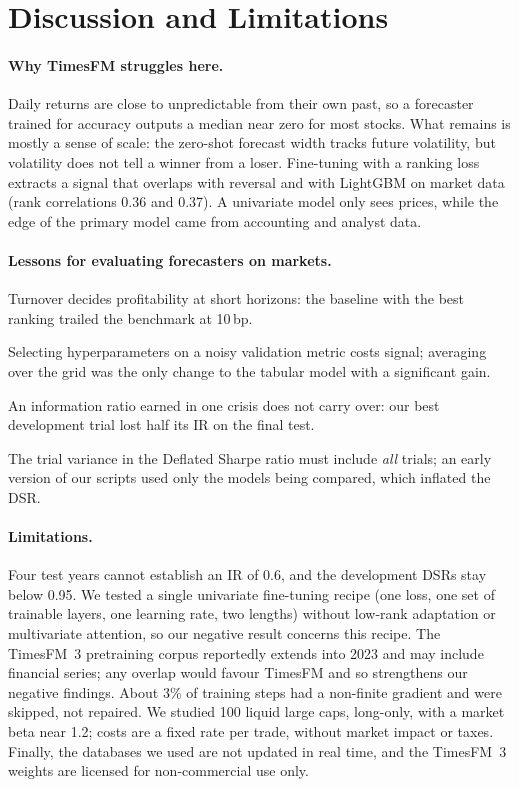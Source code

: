 \section{Discussion and Limitations}
\label{sec:discussion}

\paragraph{Why TimesFM struggles here.}
Daily returns are close to unpredictable from their own past, so a forecaster trained for accuracy outputs a median near zero for most stocks.
What remains is mostly a sense of scale: the zero-shot forecast width tracks future volatility, but volatility does not tell a winner from a loser.
Fine-tuning with a ranking loss extracts a signal that overlaps with reversal and with LightGBM on market data (rank correlations 0.36 and 0.37).
A univariate model only sees prices, while the edge of the primary model came from accounting and analyst data.

\paragraph{Lessons for evaluating forecasters on markets.}
\begin{enumerate*}[label=(\roman*)]
\item Turnover decides profitability at short horizons: the baseline with the best ranking trailed the benchmark at 10\,bp.
\item Selecting hyperparameters on a noisy validation metric costs signal; averaging over the grid was the only change to the tabular model with a significant \ric{} gain.
\item An information ratio earned in one crisis does not carry over: our best development trial lost half its IR on the final test.
\item The trial variance in the Deflated Sharpe ratio must include \emph{all} trials; an early version of our scripts used only the models being compared, which inflated the DSR.
\end{enumerate*}

\paragraph{Limitations.}
Four test years cannot establish an IR of 0.6, and the development DSRs stay below 0.95.
We tested a single univariate fine-tuning recipe (one loss, one set of trainable layers, one learning rate, two lengths) without low-rank adaptation or multivariate attention, so our negative result concerns this recipe.
The TimesFM~3 pretraining corpus reportedly extends into 2023 and may include financial series; any overlap would favour TimesFM and so strengthens our negative findings.
About 3\% of training steps had a non-finite gradient and were skipped, not repaired.
We studied 100 liquid large caps, long-only, with a market beta near 1.2; costs are a fixed rate per trade, without market impact or taxes.
Finally, the databases we used are not updated in real time, and the TimesFM~3 weights are licensed for non-commercial use only.

